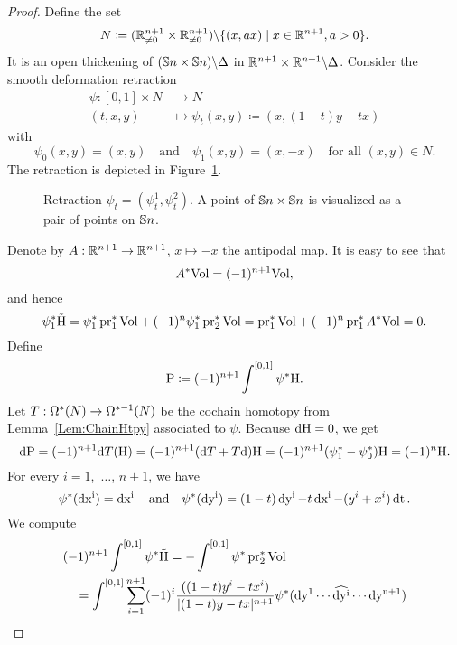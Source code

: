 \documentclass[\MainFolder/Text.tex]{subfiles}
\begin{document}
\begin{proof} %
Define the set
$$ N \coloneqq (\mathbb{R}^{n+1}_{\neq 0}\times\mathbb{R}^{n+1}_{\neq 0})\backslash \{(x,a x) \mid x\in \mathbb{R}^{n+1}, a>0\}. $$
It is an open thickening of $(\mathbb{S}{n}\times \mathbb{S}{n})\backslash \Delta$ in $\mathbb{R}^{n+1} \times \mathbb{R}^{n+1}\backslash \Delta $. Consider the smooth deformation retraction
\begin{align*}
 \psi : [0,1] \times N & \longrightarrow N \\
 (t,x,y) &\longmapsto \psi_t(x,y) \coloneqq (x,(1-t)y-tx)
\end{align*}
with 
$$ \psi_0(x,y)=(x,y) \quad \text{and}\quad \psi_1(x,y)= (x,-x)\quad\text{for all }(x,y)\in N. $$
The retraction is depicted in Figure~\ref{Fig:Retraction}.
\begin{figure}
\centering

\caption[Retraction of the configuration space $C_2(\Sph{n})$ to $\Sph{n}$.]{Retraction $\psi_t = (\psi_t^1, \psi_t^2)$. A point of $\mathbb{S}{n}\times \mathbb{S}{n}$ is visualized as a pair of points on $\Sph{n}$.}\label{Fig:Retraction}
\end{figure}
Denote by $A: \mathbb{R}^{n+1} \rightarrow \mathbb{R}^{n+1}$, $x\mapsto -x$ the antipodal map. It is easy to see that 
$$ A^* \mathrm{Vol} = (-1)^{n+1} \mathrm{Vol}, $$
and hence
\begin{equation*}
\psi_1^* \tilde{\mathrm{H}} = \psi_1^* \operatorname{\mathrm{pr}}_1^*\mathrm{Vol} + (-1)^n \psi_1^*\operatorname{\mathrm{pr}}_2^* \mathrm{Vol}  = \operatorname{\mathrm{pr}}_1^*\mathrm{Vol} + (-1)^n \operatorname{\mathrm{pr}}_1^*A^* \mathrm{Vol} = 0. 
\end{equation*}
Define 
\begin{equation}  \label{Eq:GExpr}
\mathrm{P} \coloneqq (-1)^{n+1} \int^{[0,1]} \psi^*\mathrm{H}.
\end{equation}
Let $T: \Omega^*(N)\rightarrow \Omega^{*-1}(N)$ be the cochain homotopy from Lemma~\ref{Lem:ChainHtpy} associated to $\psi$. Because $\mathrm{d} \mathrm{H}=0$, we get
$$ \mathrm{d} \mathrm{P} = (-1)^{n+1} \mathrm{d} T(\mathrm{H}) = (-1)^{n+1}(\mathrm{d} T + T \mathrm{d})\mathrm{H} = (-1)^{n+1}(\psi_1^*-\psi_0^*)\mathrm{H} = (-1)^{n}\mathrm{H}. $$
For every $i=1$,~$\dotsc$, $n+1$, we have
$$ \psi^*(\operatorname{dx^i}) = \operatorname{dx^i}\quad\text{and}\quad\psi^*(\operatorname{dy^i}) = (1-t)\operatorname{dy^i} - t\operatorname{dx^i} - (y^i+x^i)\operatorname{dt}. $$
We compute
%
\begin{equation*}
\begin{aligned}
 & (-1)^{n+1} \FInt{[0,1]} \psi^* \tilde{\HKer} = -\FInt{[0,1]} \psi^* \Pr_2^* \Vol \\
 & \quad = \FInt{[0,1]} \sum_{i=1}^{n+1} (-1)^{i}\frac{((1-t)y^i - t x^i)}{{\Abs{(1-t)y-tx}^{n+1}}} \psi^*(\Diff{y^1} \dotsm \widehat{\Diff{y^i}} \dotsm \Diff{y^{n+1}}) \\

\end{aligned}
\end{equation*}
\end{proof}
\end{document}
